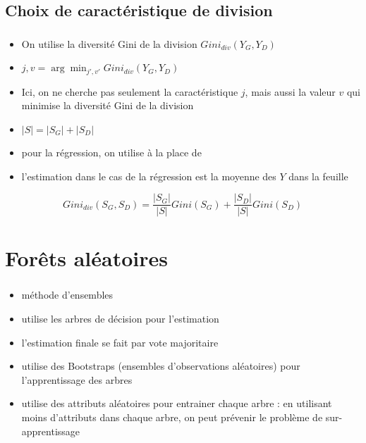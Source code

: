 \documentclass[xcolor=table]{beamer}
\begin{document}
\subsection{Choix de caractéristique de division}

\begin{frame}
	\frametitle{\insertsection}
	\framesubtitle{\insertsubsection}
	
	\begin{itemize}
		\item On utilise la diversité Gini de la division $Gini_{div}(Y_G, Y_D)$
		\item $j, v = \arg\min_{j', v'} Gini_{div}(Y_G, Y_D)$
		\item Ici, on ne cherche pas seulement la caractéristique $j$, mais aussi la valeur $v$ qui minimise la diversité Gini de la division
		\item $|S| = |S_G| + |S_D|$
		\item pour la régression, on utilise  à la place de 
		\item l'estimation dans le cas de la régression est la moyenne des $Y$ dans la feuille
	\end{itemize}
	
	\[Gini_{div}(S_G, S_D) = \frac{|S_G|}{|S|} Gini(S_G) + \frac{|S_D|}{|S|} Gini(S_D)\]
	
	
\end{frame}

\section{Forêts aléatoires}

\begin{frame}
	\frametitle{\insertsection}
	
	\begin{itemize}
		\item méthode d'ensembles
		\item utilise les arbres de décision pour l'estimation
		\item l'estimation finale se fait par vote majoritaire 
		\item utilise des Bootstraps (ensembles d'observations aléatoires) pour l'apprentissage des arbres 
		\item utilise des attributs aléatoires pour entrainer chaque arbre : en utilisant moins d'attributs dans chaque arbre, on peut prévenir le problème de sur-apprentissage
	\end{itemize}
	
\end{frame}
\end{document}
